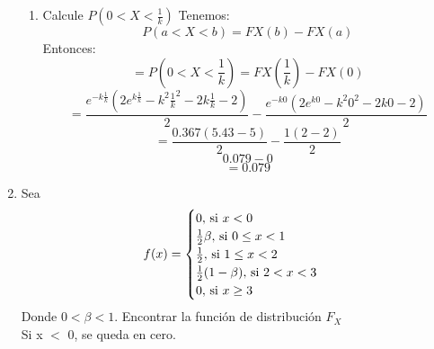 \documentclass[12pt,a4paper]{report}
\begin{document}
\begin{enumerate}
{\begin{enumerate}
{				Entonces tenemos:
					\[FX(x) = \int_{0}^{x} \gamma x^2 e^{-kx} dx\]
				Pero ya tenemos que $\gamma = \frac{k^{3}}{2}$, entonces:
					\[FX(x) = \int_{0}^{x} \frac{k^{3}}{2} x^2 e^{-kx} dx\]
				Entonces calculando el integral tenemos:
					\[FX(x) =  \frac{(k^{2}x^{2} + 2kx + 2) e^{-kx}}{2}\Big|_0^x \]
				Y sustituyendo tenemos:
					\[FX(x)= \frac{e^{-kx} (2e^{kx} - k^{2} x^{2} -2kx - 2)}{2}\]
			}
			\item {
				Calcule $P(0 < X < \frac{1}{k})$
				Tenemos:
				\[ P(a < X < b) = FX(b) - FX(a)\]
				Entonces:
				\[=P(0 < X < \frac{1}{k}) = FX(\frac{1}{k}) - FX(0)\]
				\[=\frac{e^{-k\frac{1}{k}} (2e^{k\frac{1}{k}} - k^{2} \frac{1}{k}^{2} -2k\frac{1}{k} - 2)}{2} - \frac{e^{-k0} (2e^{k0} - k^{2} 0^{2} -2k0 - 2)}{2}\]
			    \[=\frac{0.367 (5.43 - 5)}{2} - \frac{1 (2 - 2)}{2}\]
				\[0.079 - 0\]
				\[=0.079 \]
			}
		\end{enumerate}
		}
		\item {
			Sea
			\[
				f(x) = \begin{cases}
								0, $ si $ x < 0\\
								\frac{1}{2}\beta, $ si $ 0 \leq x < 1\\
								\frac{1}{2}, $ si $ 1 \leq x < 2\\
								\frac{1}{2}(1-\beta), $ si $ 2 < x < 3\\
								0, $ si $ x \geq 3
						 	 \end{cases}
			\]
			Donde $0 < \beta < 1$. Encontrar la función de distribución $F_X$\\

			Si x $<$ 0, se queda en cero.

}
\end{enumerate}
\end{document}
